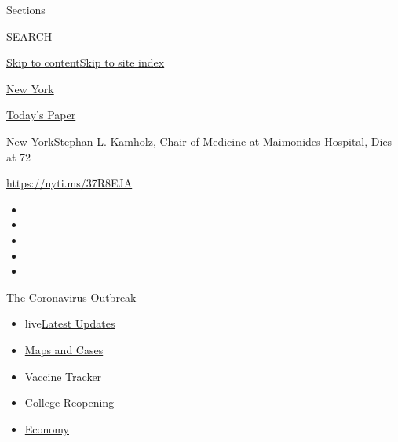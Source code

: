 Sections

SEARCH

\protect\hyperlink{site-content}{Skip to
content}\protect\hyperlink{site-index}{Skip to site index}

\href{https://www.nytimes3xbfgragh.onion/section/nyregion}{New York}

\href{https://myaccount.nytimes3xbfgragh.onion/auth/login?response_type=cookie\&client_id=vi}{}

\href{https://www.nytimes3xbfgragh.onion/section/todayspaper}{Today's
Paper}

\href{/section/nyregion}{New York}\textbar{}Stephan L. Kamholz, Chair of
Medicine at Maimonides Hospital, Dies at 72

\url{https://nyti.ms/37R8EJA}

\begin{itemize}
\item
\item
\item
\item
\item
\end{itemize}

\href{https://www.nytimes3xbfgragh.onion/news-event/coronavirus?action=click\&pgtype=Article\&state=default\&region=TOP_BANNER\&context=storylines_menu}{The
Coronavirus Outbreak}

\begin{itemize}
\tightlist
\item
  live\href{https://www.nytimes3xbfgragh.onion/2020/08/04/world/coronavirus-covid-19.html?action=click\&pgtype=Article\&state=default\&region=TOP_BANNER\&context=storylines_menu}{Latest
  Updates}
\item
  \href{https://www.nytimes3xbfgragh.onion/interactive/2020/us/coronavirus-us-cases.html?action=click\&pgtype=Article\&state=default\&region=TOP_BANNER\&context=storylines_menu}{Maps
  and Cases}
\item
  \href{https://www.nytimes3xbfgragh.onion/interactive/2020/science/coronavirus-vaccine-tracker.html?action=click\&pgtype=Article\&state=default\&region=TOP_BANNER\&context=storylines_menu}{Vaccine
  Tracker}
\item
  \href{https://www.nytimes3xbfgragh.onion/2020/08/02/us/covid-college-reopening.html?action=click\&pgtype=Article\&state=default\&region=TOP_BANNER\&context=storylines_menu}{College
  Reopening}
\item
  \href{https://www.nytimes3xbfgragh.onion/live/2020/08/03/business/stock-market-today-coronavirus?action=click\&pgtype=Article\&state=default\&region=TOP_BANNER\&context=storylines_menu}{Economy}
\end{itemize}

